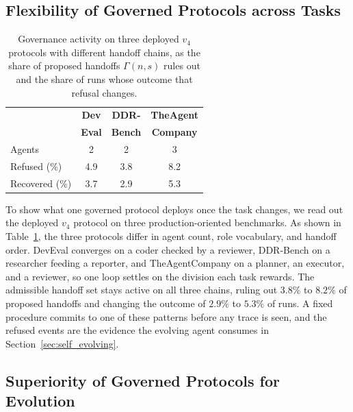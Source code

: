 \documentclass{article} %
\begin{document}
\subsection{Flexibility of Governed Protocols across Tasks}
\label{sec:admissible}

\begin{table}
\vspace{-\intextsep}
\caption{Governance activity on three deployed $v_4$ protocols with different handoff chains, as the share of proposed handoffs $\Gamma(n,s)$ rules out and the share of runs whose outcome that refusal changes.}
\vspace{2mm}
\label{tab:handoff}
\centering
\small
\setlength{\tabcolsep}{4pt}
\begin{tabular}{lccc}
\toprule
 & \textbf{Dev} & \textbf{DDR-} & \textbf{TheAgent} \\
 & \textbf{Eval} & \textbf{Bench} & \textbf{Company} \\
\midrule
Agents        & 2 & 2 & 3 \\
Refused (\%)   & 4.9 & 3.8 & 8.2 \\
Recovered (\%) & 3.7 & 2.9 & 5.3 \\
\bottomrule
\end{tabular}
\end{table}
To show what one governed protocol deploys once the task changes, we read out the deployed $v_4$ protocol on three production-oriented benchmarks. As shown in Table~\ref{tab:handoff}, the three protocols differ in agent count, role vocabulary, and handoff order. DevEval converges on a coder checked by a reviewer, DDR-Bench on a researcher feeding a reporter, and TheAgentCompany on a planner, an executor, and a reviewer, so one loop settles on the division each task rewards. The admissible handoff set stays active on all three chains, ruling out $3.8\%$ to $8.2\%$ of proposed handoffs and changing the outcome of $2.9\%$ to $5.3\%$ of runs. A fixed procedure commits to one of these patterns before any trace is seen, and the refused events are the evidence the evolving agent consumes in Section~\ref{sec:self_evolving}.

\subsection{Superiority of Governed Protocols for Evolution}
\label{sec:fixed_topology}

\end{document}
